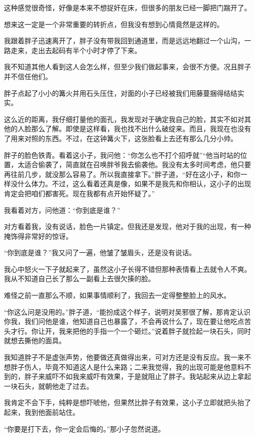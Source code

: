 这种感觉很奇怪，好像是本来不想捉奸在床，但很多的朋友已经一脚把门踹开了。

想来这一定是一个非常重要的转折点，但我没有想到心情竟然是这样的。

我跟着胖子迅速离开了，胖子没有带我回到通道里，而是远远地翻过一个山沟，一路走来，走出去起码有半个小时才停了下来。

我不知道其他人看到这人会怎么样，但至少我们做起事来，会很不方便。况且胖子并不信任他们。

胖子点起了小小的篝火并用石头压住，对面的小子已经被我们用藤蔓捆得结结实实。

这么近的距离，我仔细打量他的面孔，我发现对于确定我自己的脸，其实不如对其他的人脸那么了解。即使是这样看，我也找不出什么破绽来。而且，我现在也没有了用来对照的东西。不过，在这钟篝火下，这张脸看上去还有那么几分小帅。

胖子的脸色铁青。看着这小子，我问他：“你怎么也不打个招呼就”“他当时站的位置，太适合偷袭了，简直就在召唤胖爷我去偷袭他。我没有太多时间考虑，他只要再往前几步，就没那么容易了。所以我直接拿下。”胖子道，“好在这小子，和你一样没什么体力。不过，这么看着还真是像，如果不是我先和你相认，这小子的出现肯定会把咱们都害死。现在我都有点开始怀疑了。”

我看着对方，问他道：“你到底是谁？”

对方看着我，没有说话，脸色一片镇定。但我还是发现，他对于我的出现，有一种掩饰得非常好的惊讶。

“你到底是谁？”我又问了一遍，他皱了皱眉头，还是没有说话。

我心中怒火一下子就起来了，虽然这小子长得不错但那种表情看上去就令人不爽。我从不知道自己长了那么一副看上去很欠揍的脸。

难怪之前一直那么不顺，如果事情顺利了，我回去一定得整整脸上的风水。

“你这么问是没用的。”胖子道，“能扮成这个样子，说明对吴邪很了解，那肯定认识你我，我们问他是谁，他知道自己也暴露了，不会再说什么了，现在要让他吃点苦头才行。你让开，我来把他的手指一个一个砸烂。”说着胖子就捡起一块石头，同时就想去撕他的面具。

我知道胖子不是虚张声势，他要做还真做得出来，可对方还是没有反应。我一来不想胖子伤人，毕竟不知道这人是什么来路；二来我觉得，我的出现可能是他意料不到的，胖子来威吓不如我来威吓有效果，于是就阻止了胖子。我站起来从边上拿起一块石头，就朝他走了过去。

我肯定不会下手，纯粹是想吓唬他，但果然比胖子有效果，这小子立即就把头抬了起来，我到他面前站住。

“你要是打下去，你一定会后悔的。”那小子忽然说道。

